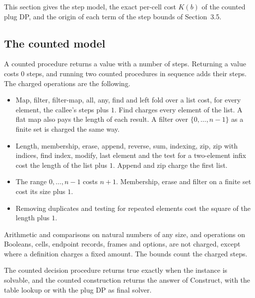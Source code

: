 \documentclass[11pt]{article}
\begin{document}
This section gives the step model, the exact per-cell cost $K(b)$ of the counted plug DP, and the
origin of each term of the step bounds of Section~3.5.

\subsection{The counted model}

A counted procedure returns a value with a number of steps. Returning a value costs $0$ steps, and
running two counted procedures in sequence adds their steps. The charged operations are the
following.
\begin{itemize}
\item Map, filter, filter-map, all, any, find and left fold over a list cost, for every element,
  the callee's steps plus $1$. Find charges every element of the list. A flat map also pays the
  length of each result. A filter over $\{0,\ldots,n-1\}$ as a finite set is charged the same way.
\item Length, membership, erase, append, reverse, sum, indexing, zip, zip with indices, find index,
  modify, last element and the test for a two-element infix cost the length of the list plus $1$.
  Append and zip charge the first list.
\item The range $0,\ldots,n-1$ costs $n+1$. Membership, erase and filter on a finite set cost its
  size plus $1$.
\item Removing duplicates and testing for repeated elements cost the square of the length plus
  $1$.
\end{itemize}
Arithmetic and comparisons on natural numbers of any size, and operations on Booleans, cells,
endpoint records, frames and options, are not charged, except where a definition charges a fixed
amount. The bounds count the charged steps.

The counted decision procedure returns true exactly when the instance is solvable, and the counted
construction returns the answer of Construct, with the table lookup or with the plug DP as final
solver.
\end{document}
